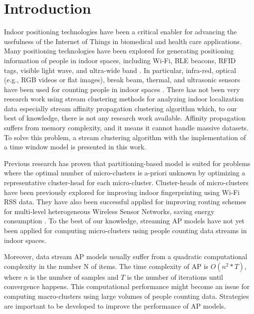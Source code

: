 \setlength{\parindent}{2em}
% 
\chapter{Introduction}



Indoor positioning technologies have been a critical enabler for advancing the usefulness of the Internet of Things in biomedical and health care applications. Many positioning technologies have been explored for generating positioning information of people in indoor spaces, including Wi-Fi, BLE beacons, RFID tags, visible light wave, and ultra-wide band \cite{namiot2015indoor, jeon2018ble}. In particular, infra-red, optical (e.g., RGB videos or flat images), break beam, thermal, and ultrasonic sensors have been used for counting people in indoor spaces \cite{mautz2012indoor}. There has not been very research work using stream clustering methods for analyzing indoor localization data especially stream affinity propagation clustering algorithm \cite{dueck2009affinity} which, to our best of knowledge, there is not any research work available. Affinity propagation suffers from memory complexity, and it means it cannot handle massive datasets. To solve this problem, a stream clustering algorithm with the implementation of a time window model is presented in this work. 


Previous research has proven that partitioning-based model is suited for problems where the optimal number of micro-clusters is a-priori unknown by optimizing a representative cluster-head for each micro-cluster. Cluster-heads of micro-clusters have been previously explored for improving indoor fingerprinting using Wi-Fi RSS data\cite{hu2015improving, subedi2019improving}. They have also been successful applied for improving routing schemes for multi-level heterogeneous Wireless Sensor Networks, saving energy consumption \cite{wang2019affinity}. To the best of our knowledge,  streaming AP models have not yet been applied for computing micro-clusters using people counting data streams in indoor spaces.  

Moreover, data stream AP models usually suffer from a quadratic computational complexity in the number N of items. The time complexity of AP is $O(n^2*T)$, where $n$ is the number of samples and $T$ is the number of iterations until convergence happens\cite{refianti2017time}. This computational performance might become an issue for computing macro-clusters using large volumes of people counting data. Strategies are important to be developed to improve the performance of AP models. 

